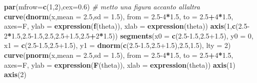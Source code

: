 \documentclass[
  11pt,
]{book}
\newenvironment{Shaded}{\begin{snugshade}}{\end{snugshade}}
\newcommand{\AttributeTok}[1]{\textcolor[rgb]{0.13,0.29,0.53}{#1}}
\newcommand{\CommentTok}[1]{\textcolor[rgb]{0.56,0.35,0.01}{\textit{#1}}}
\newcommand{\DecValTok}[1]{\textcolor[rgb]{0.00,0.00,0.81}{#1}}
\newcommand{\FloatTok}[1]{\textcolor[rgb]{0.00,0.00,0.81}{#1}}
\newcommand{\FunctionTok}[1]{\textcolor[rgb]{0.13,0.29,0.53}{\textbf{#1}}}
\newcommand{\NormalTok}[1]{#1}
\newcommand{\SpecialCharTok}[1]{\textcolor[rgb]{0.81,0.36,0.00}{\textbf{#1}}}
\theoremstyle{mytheoremstyle}
\theoremstyle{mydefstyle}
\begin{document}
\begin{Shaded}
\begin{Highlighting}[]
\FunctionTok{par}\NormalTok{(}\AttributeTok{mfrow=}\FunctionTok{c}\NormalTok{(}\DecValTok{1}\NormalTok{,}\DecValTok{2}\NormalTok{),}\AttributeTok{cex=}\FloatTok{0.6}\NormalTok{) }\CommentTok{\# metto una figura accanto all\textquotesingle{}altra}
\FunctionTok{curve}\NormalTok{(}\FunctionTok{dnorm}\NormalTok{(x,}\AttributeTok{mean =} \FloatTok{2.5}\NormalTok{,}\AttributeTok{sd =} \FloatTok{1.5}\NormalTok{),}
      \AttributeTok{from =} \FloatTok{2.5}\DecValTok{{-}4}\SpecialCharTok{*}\FloatTok{1.5}\NormalTok{,}
      \AttributeTok{to =} \FloatTok{2.5}\SpecialCharTok{+}\DecValTok{4}\SpecialCharTok{*}\FloatTok{1.5}\NormalTok{,}
      \AttributeTok{axes=}\NormalTok{F,}
      \AttributeTok{ylab =} \FunctionTok{expression}\NormalTok{(}\FunctionTok{f}\NormalTok{(theta)),}
      \AttributeTok{xlab =} \FunctionTok{expression}\NormalTok{(theta))}
\FunctionTok{axis}\NormalTok{(}\DecValTok{1}\NormalTok{,}\FunctionTok{c}\NormalTok{(}\FloatTok{2.5}\DecValTok{{-}2}\SpecialCharTok{*}\FloatTok{1.5}\NormalTok{,}\FloatTok{2.5{-}1.5}\NormalTok{,}\FloatTok{2.5}\NormalTok{,}\FloatTok{2.5+1.5}\NormalTok{,}\FloatTok{2.5}\SpecialCharTok{+}\DecValTok{2}\SpecialCharTok{*}\FloatTok{1.5}\NormalTok{))}
\FunctionTok{segments}\NormalTok{(}\AttributeTok{x0 =} \FunctionTok{c}\NormalTok{(}\FloatTok{2.5{-}1.5}\NormalTok{,}\FloatTok{2.5+1.5}\NormalTok{),}
         \AttributeTok{y0 =} \DecValTok{0}\NormalTok{,}
         \AttributeTok{x1 =} \FunctionTok{c}\NormalTok{(}\FloatTok{2.5{-}1.5}\NormalTok{,}\FloatTok{2.5+1.5}\NormalTok{),}
         \AttributeTok{y1 =} \FunctionTok{dnorm}\NormalTok{(}\FunctionTok{c}\NormalTok{(}\FloatTok{2.5{-}1.5}\NormalTok{,}\FloatTok{2.5+1.5}\NormalTok{),}\FloatTok{2.5}\NormalTok{,}\FloatTok{1.5}\NormalTok{),}
         \AttributeTok{lty =} \DecValTok{2}\NormalTok{)}
\FunctionTok{curve}\NormalTok{(}\FunctionTok{pnorm}\NormalTok{(x,}\AttributeTok{mean =} \FloatTok{2.5}\NormalTok{,}\AttributeTok{sd =} \FloatTok{1.5}\NormalTok{),}
      \AttributeTok{from =} \FloatTok{2.5}\DecValTok{{-}4}\SpecialCharTok{*}\FloatTok{1.5}\NormalTok{,}
      \AttributeTok{to =} \FloatTok{2.5}\SpecialCharTok{+}\DecValTok{4}\SpecialCharTok{*}\FloatTok{1.5}\NormalTok{,}
      \AttributeTok{axes=}\NormalTok{F,}
      \AttributeTok{ylab =} \FunctionTok{expression}\NormalTok{(}\FunctionTok{F}\NormalTok{(theta)),}
      \AttributeTok{xlab =} \FunctionTok{expression}\NormalTok{(theta))}
\FunctionTok{axis}\NormalTok{(}\DecValTok{1}\NormalTok{)}
\FunctionTok{axis}\NormalTok{(}\DecValTok{2}\NormalTok{)}
\end{Highlighting}
\end{Shaded}
\end{document}
